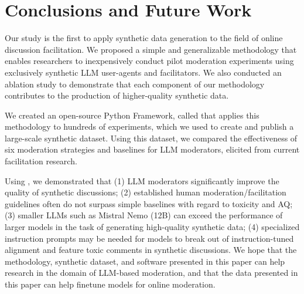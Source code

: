 %
\section{Conclusions and Future Work}

Our study is the first to apply synthetic data generation to the field of online discussion facilitation. We proposed a simple and generalizable methodology that enables researchers to inexpensively conduct pilot moderation experiments using exclusively synthetic \ac{LLM} user-agents and facilitators. We also conducted an ablation study to demonstrate that each component of our methodology contributes to the production of higher-quality synthetic data.

We created an open-source Python Framework, called \syndisco that applies this methodology to hundreds of experiments, which we used to create and publish \vmd a large-scale synthetic dataset. Using this dataset, we compared the effectiveness of six moderation strategies and baselines for \ac{LLM} moderators, elicited from current facilitation research. 

Using \syndisco, we demonstrated that (1) \ac{LLM} moderators significantly improve the quality of synthetic discussions; (2) established human moderation/facilitation guidelines often do not surpass simple baselines with regard to toxicity and \ac{AQ}; (3) smaller \acp{LLM} such as Mistral Nemo (12B) can exceed the performance of larger models in the task of generating high-quality synthetic data; (4) specialized instruction prompts may be needed for models to break out of instruction-tuned alignment and feature toxic comments in synthetic discussions. We hope that the methodology, synthetic dataset, and software presented in this paper can help research in the domain of \ac{LLM}-based moderation, and that the data presented in this paper can help finetune models for online moderation.
